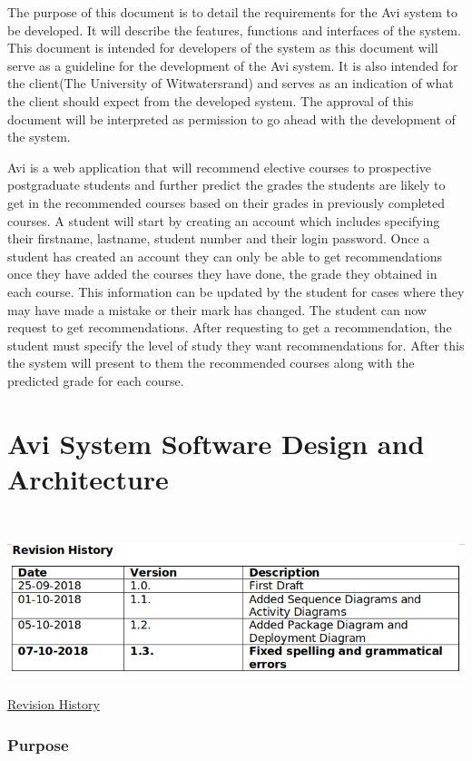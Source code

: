 \documentclass[10pt]{article}
\begin{document}
The purpose of this document is to detail the requirements for the Avi system to be developed. It will describe the features, functions and interfaces of the system. This document is intended for developers of the system as this document will serve as a guideline for the development of the Avi system. It is also intended for the client(The University of Witwatersrand) and serves as an indication of what the client should expect from the developed system. The approval of this document will be interpreted as permission to go ahead with the development of the system.

Avi is a web application that will recommend elective courses to prospective postgraduate students and further predict the grades the students are likely to get in the recommended courses based on their grades in previously completed courses. A student will start by creating an account which includes specifying their firstname, lastname, student number and their login password. Once a student has created an account they can only be able to get recommendations once they have added the courses they have done, the grade they obtained in each course. This information can be updated by the student for cases where they may have made a mistake or their mark has changed. The student can now request to get recommendations. After requesting to get a recommendation, the student must specify the level of study they want recommendations for. After this the system will present to them the recommended courses along with the predicted grade for each course.

\section{Avi System Software Design and Architecture} \\


\begin{center}
\includegraphics[width=.9\textwidth]{revision_history.png}
\end{center}
\caption{\underline{Revision History}}


\subsubsection{Purpose}
\end{document}
